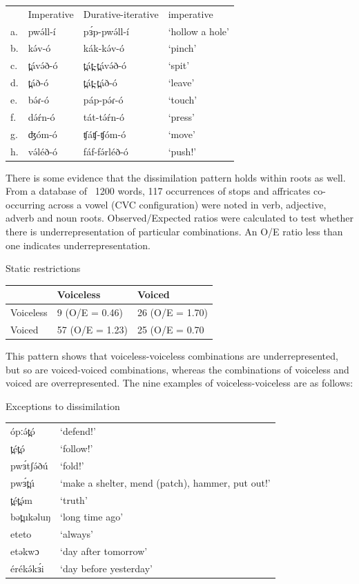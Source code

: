 \ea
\begin{tabular}[t]{llll}
&		Imperative	&Durative-iterative &imperative\\
a.	&	pwə́ll-í	&	pɜ́p-pwə́ll-í	&	‘hollow a hole’\\
b.	&	kə́v-ó	&	kák-kə́v-ó	&	‘pinch’\\
c.	&	t̪ávə́ð-ó	&	t̪át̪-t̪ávə́ð-ó	&	‘spit’\\
d.	&	t̪áð-ó	&	t̪át̪-t̪áð-ó	&	‘leave’\\
e.	&	bə́ɾ-ó	&	páp-pə́ɾ-ó	&	‘touch’\\
f.	&	də́ŕn-ó	&	tát-tə́ŕn-ó	&	‘press’\\
g.	&	ʤóm-ó	&	ʧáʧ-ʧóm-ó	&	‘move’\\
h.	&	və́léð-ó	&	fáf-fə́rléð-ó	&	‘push!’\\
\end{tabular}
\z

There is some evidence that the dissimilation pattern holds within roots as well. From a database of ~1200 words, 117 occurrences of stops and affricates co-occurring across a vowel (CVC configuration) were noted in verb, adjective, adverb and noun roots. Observed/Expected ratios were calculated to test whether there is underrepresentation of particular combinations. An O/E ratio less than one indicates underrepresentation.

\ea Static restrictions\\
\begin{tabular}[t]{l|ll}
&	Voiceless	&	Voiced\\
\hline
Voiceless	&	9  (O/E = 0.46)	&	26   (O/E = 1.70)\\
Voiced		&	57  (O/E = 1.23)&	25   (O/E = 0.70\\
\end{tabular}
\z

This pattern shows that voiceless-voiceless combinations are underrepresented, but so are voiced-voiced combinations, whereas the combinations of voiceless and voiced are overrepresented. The nine examples of voiceless-voiceless are as follows:

\ea Exceptions to dissimilation\\
\begin{tabular}[t]{ll}
ópːə́t̪ó 	&	‘defend!’\\
t̪ét̪ó 	&	‘follow!’\\
pwɜ́tʃə́ðú	&	‘fold!’\\
pwɜ́t̪ú	&	‘make a shelter, mend (patch), hammer, put out!’\\
t̪ét̪ə́m	&	‘truth’\\
bət̪ukəluŋ&	‘long time ago’\\
eteto	&	‘always’\\
etəkwɔ	&	‘day after tomorrow’\\
érékə́kɜ́i	&	‘day before yesterday’\\
\end{tabular}
\z

